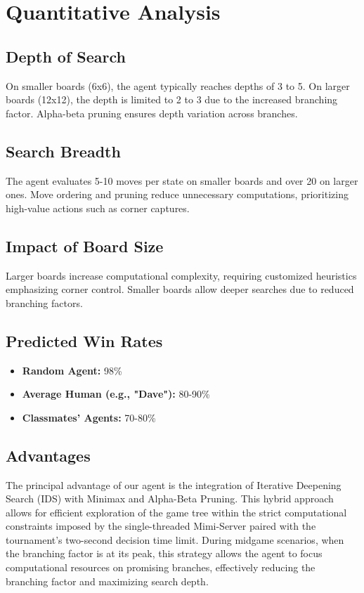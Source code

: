 \documentclass[11pt]{article}
\begin{document}
\section*{Quantitative Analysis}
\subsection*{Depth of Search}
On smaller boards (6x6), the agent typically reaches depths of 3 to 5. On larger boards (12x12), the depth is limited to 2 to 3 due to the increased branching factor. Alpha-beta pruning ensures depth variation across branches.

\subsection*{Search Breadth}
The agent evaluates 5-10 moves per state on smaller boards and over 20 on larger ones. Move ordering and pruning reduce unnecessary computations, prioritizing high-value actions such as corner captures.

\subsection*{Impact of Board Size}
Larger boards increase computational complexity, requiring customized heuristics emphasizing corner control. Smaller boards allow deeper searches due to reduced branching factors.

\subsection*{Predicted Win Rates}
\begin{itemize}
    \item \textbf{Random Agent:} 98\%
    \item \textbf{Average Human (e.g., "Dave"):} 80-90\%
    \item \textbf{Classmates' Agents:} 70-80\%
\end{itemize}

\subsection*{Advantages}
The principal advantage of our agent is the integration of Iterative Deepening Search (IDS) with Minimax and Alpha-Beta Pruning. This hybrid approach allows for efficient exploration of the game tree within the strict computational constraints imposed by the single-threaded Mimi-Server paired with the tournament’s two-second decision time limit. During midgame scenarios, when the branching factor is at its peak, this strategy allows the agent to focus computational resources on promising branches, effectively reducing the branching factor and maximizing search depth.
\end{document}
